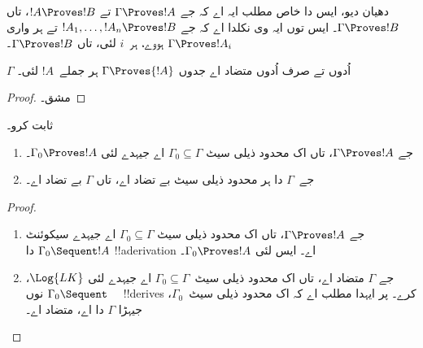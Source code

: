 \documentclass[../../../include/open-logic-section]{subfiles}
\begin{document}
دھیان دیو، ایس دا خاص مطلب ایہ اے کہ جے $\Gamma \Proves !A$ تے $!A
\Proves !B$، تاں $\Gamma \Proves !B$۔ ایس توں ایہ وی نکلدا اے کہ جے $!A_1,
\dots, !A_n \Proves !B$ تے ہر واری $\Gamma \Proves !A_i$ ہووے، ہر~$i$ لئی، تاں $\Gamma \Proves !B$۔

\begin{prop}
$\Gamma$ اُدوں تے صرف اُدوں متضاد اے جدوں $\Gamma \Proves {!A}$ ہر جملے~$!A$ لئی۔
\end{prop}

\begin{proof}
مشق۔
\end{proof}

\begin{prob}
 ثابت کرو۔
\end{prob}

\begin{prop}
  \begin{enumerate}
  \item جے $\Gamma \Proves !A$، تاں اک محدود ذیلی سیٹ $\Gamma_0
    \subseteq \Gamma$ اے جیہدے لئی $\Gamma_0 \Proves !A$۔
  \item جے~$\Gamma$ دا ہر محدود ذیلی سیٹ بے تضاد اے، تاں $\Gamma$ بے تضاد اے۔
  \end{enumerate}
\end{prop}

\begin{proof}
  \begin{enumerate}
    \item جے $\Gamma \Proves !A$، تاں اک محدود ذیلی سیٹ $\Gamma_0 \subseteq \Gamma$ اے جیہدے سیکوئنٹ $\Gamma_0
      \Sequent !A$ دا !!a{derivation} اے۔ ایس لئی $\Gamma_0
      \Proves !A$۔
    \item جے $\Gamma$ متضاد اے، تاں اک محدود ذیلی سیٹ~$\Gamma_0 \subseteq \Gamma$ اے جیہدے لئی $\Log{LK}$، $\Gamma_0 \Sequent \quad$ نوں !!{derive}s کرے۔ پر ایہدا مطلب اے کہ اک محدود ذیلی سیٹ~$\Gamma_0$، جیہڑا $\Gamma$ دا اے، متضاد اے۔
  \end{enumerate}
\end{proof}
\end{document}
